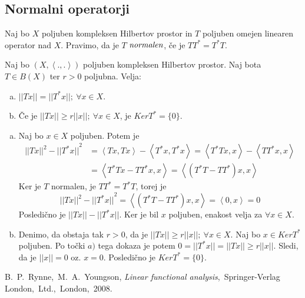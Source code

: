 \documentclass[mat2]{matdelo}
\newcommand{\abs}[1]{\ensuremath{\lvert #1 \rvert}}
\newcommand{\norm}[1]{\abs{\abs{#1}}}
\newcommand{\pojem}[1]{\ensuremath{\emph{#1}}}
\newcommand{\Sp}[2]{\ensuremath{\left<#1, #2\right>}}
\begin{document}
		\subsection{Normalni operatorji}
			\begin{definicija}
				\label{def:normalop}
				Naj bo $X$ poljuben kompleksen Hilbertov prostor in $T$ poljuben omejen linearen operator nad $X$. Pravimo, da je $T$ \pojem{normalen}, če je $TT^* = T^*T$.
			\end{definicija}
			
			\begin{lema}
				\label{lem:normalnorm}
				Naj bo $(X, \Sp{.}{.})$ poljuben kompleksen Hilbertov prostor. Naj bota $T\in B(X)$ ter $r > 0$ poljubna. Velja: \begin{enumerate}[a)]
					\item $\norm{Tx} = \norm{T^*x};~\forall x\in X$.
					\item Če je $\norm{Tx} \geq r\norm{x};~\forall x\in X$, je $KerT^* = \{0\}$.
				\end{enumerate}
			\end{lema}
			\begin{dokaz}
				\begin{enumerate}[a)]
					\item Naj bo $x\in X$ poljuben. Potem je \begin{align*}
						\norm{Tx}^2 - \norm{T^*x}^2 &= \Sp{Tx}{Tx} - \Sp{T^*x}{T^*x} = \Sp{T^*Tx}{x} - \Sp{TT^*x}{x}\\
						&= \Sp{T^*Tx - TT^*x}{x} = \Sp{(T^*T - TT^*)x}{x}
					\end{align*}
					Ker je $T$ normalen, je $TT^* = T^*T$, torej je $$\norm{Tx}^2 - \norm{T^*x}^2 = \Sp{(T^*T - TT^*)x}{x} = \Sp{0}{x} = 0 $$
					Posledično je $\norm{Tx} - \norm{T^*x}$. Ker je bil $x$ poljuben, enakost velja za $\forall x\in X$.
					\item Denimo, da obstaja tak $r>0$, da je $\norm{Tx} \geq r\norm{x};~\forall x\in X$. Naj bo $x\in KerT^*$ poljuben. Po točki $a)$ tega dokaza je potem $0 = \norm{T^*x} = \norm{Tx} \geq r\norm{x}$. Sledi, da je $\norm{x} = 0$ oz. $x = 0$. Posledično je $KerT^* = \{0\}$.
				\end{enumerate}
			\end{dokaz}
	\begin{thebibliography}{99}
		 B.~P.~Rynne,~M.~A.~Youngson, \emph{Linear functional analysis},~Springer-Verlag London,~Ltd.,~London,~2008.
	\end{thebibliography}
\end{document}
